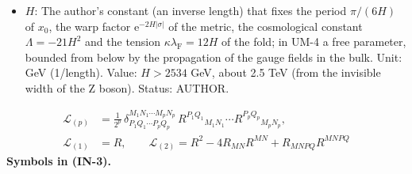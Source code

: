 \documentclass[
  10pt,
]{article}
\begin{document}
\begin{itemize}
  \((1, 1/32, 1/1152)\). Status: AUTHOR (the form), DERIVED (the values
  that the order of 2026-10-25 selects).
\item
  \(H\): The author's constant (an inverse length) that fixes the period
  \(\pi/(6H)\) of \(x_0\), the warp factor
  \(\mathrm{e}^{-2H\lvert\sigma\rvert}\) of the metric, the cosmological
  constant \(\Lambda = -21H^2\) and the tension
  \(\kappa\lambda_{\mathrm{F}} = 12H\) of the fold; in UM-4 a free
  parameter, bounded from below by the propagation of the gauge fields
  in the bulk. Unit: GeV (1/length). Value: \(H > 2534\) GeV, about 2.5
  TeV (from the invisible width of the Z boson). Status: AUTHOR.
\end{itemize}

\[
\begin{aligned}
\mathcal{L}_{(p)} &= \frac{1}{2^{p}}\,\delta^{M_1N_1\cdots M_pN_p}_{P_1Q_1\cdots P_pQ_p}\,
 R^{P_1Q_1}{}_{M_1N_1}\cdots R^{P_pQ_p}{}_{M_pN_p},\\
\mathcal{L}_{(1)} &= R,\qquad \mathcal{L}_{(2)} = R^2 - 4R_{MN}R^{MN} + R_{MNPQ}R^{MNPQ}
\end{aligned} \tag{IN-3}
\] \textbf{Symbols in (IN-3).}
\end{document}
